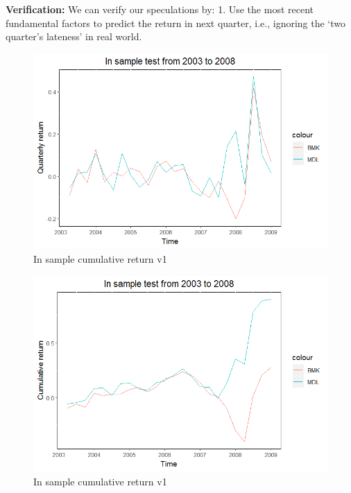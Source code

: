 \documentclass[]{article}
\begin{document}
\textbf{Verification:} We can verify our speculations by: 1. Use the
most recent fundamental factors to predict the return in next quarter,
i.e., ignoring the `two quarter's lateness' in real world.

\begin{figure}[H]
\begin{center}
\includegraphics[width=5in]{Lab//In_sample_qtrly_return_v1.jpg}
\caption{In sample cumulative return v1}
\label{figure8}
\end{center}
\end{figure}

\begin{figure}[H]
\begin{center}
\includegraphics[width=5in]{Lab//In_sample_cumu_return_v1.jpg}
\caption{In sample cumulative return v1}
\label{figure9}
\end{center}
\end{figure}
\end{document}
